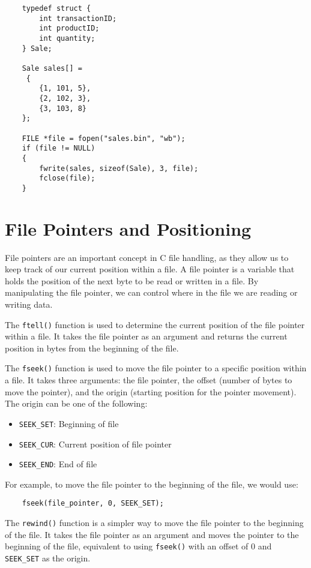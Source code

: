 \begin{verbatim}
	typedef struct {
		int transactionID;
		int productID;
		int quantity;
	} Sale;
	
	Sale sales[] =
	 {
		{1, 101, 5},
		{2, 102, 3},
		{3, 103, 8}
	};
	
	FILE *file = fopen("sales.bin", "wb");
	if (file != NULL) 
	{
		fwrite(sales, sizeof(Sale), 3, file);
		fclose(file);
	}
\end{verbatim}


\section{File Pointers and Positioning}
File pointers are an important concept in C file handling, as they allow us to
keep track of our current position within a file. A file pointer is a variable
that holds the position of the next byte to be read or written in a file. By
manipulating the file pointer, we can control where in the file we are reading
or writing data.

The {\tt ftell()} function is used to determine the current position of the file
pointer within a file. It takes the file pointer as an argument and returns the
current position in bytes from the beginning of the file.

The {\tt fseek()} function is used to move the file pointer to a specific
position within a file. It takes three arguments: the file pointer, the offset
(number of bytes to move the pointer), and the origin (starting position for
the pointer movement). The origin can be one of the following:

\begin{itemize}
	\item {\tt SEEK_SET}: Beginning of file
	\item {\tt SEEK_CUR}: Current position of file pointer
	\item {\tt SEEK_END}: End of file
\end{itemize}

For example, to move the file pointer to the beginning of the file, we would use:

\begin{verbatim}
	fseek(file_pointer, 0, SEEK_SET);
\end{verbatim}

The {\tt rewind()} function is a simpler way to move the file pointer to the
beginning of the file. It takes the file pointer as an argument and moves the
pointer to the beginning of the file, equivalent to using {\tt fseek()} with
an offset of 0 and {\tt SEEK_SET} as the origin.

